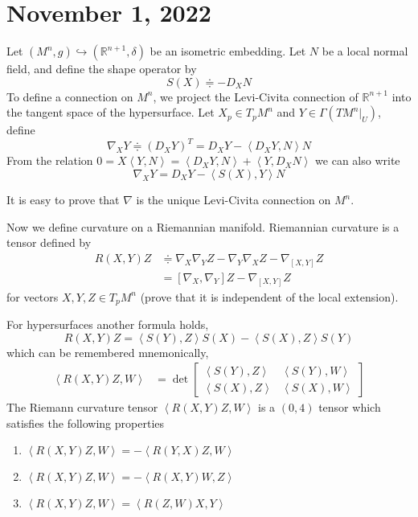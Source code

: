 \documentclass[12pt,a4paper]{article}
\theoremstyle{definition}
\theoremstyle{greenbox}
\newcommand{\define}{\doteqdot}
\newcommand{\Rn}{\mathbb{R}^{n+1}}
\begin{document}
    \section{November 1, 2022}
    Let $ (M^{n},g) \hookrightarrow (\Rn, \delta) $ be an isometric embedding. Let $ N $ be a local normal field, and define the shape operator by
    \[ S(X) \define - D_{X}N \]
    To define a connection on $ M^{n} $, we project the Levi-Civita connection of $ \Rn $ into the tangent space of the hypersurface. Let $ X_{p} \in T_{p}M^{n} $ and $ Y \in \Gamma(TM^{n}|_{U}) $, define 
    \[ \nabla_{X}Y \define (D_{X}Y)^{T} = D_{X}Y - \left< D_{X}Y,N \right>N \]
    From the relation $ 0 = X \left< Y,N \right> = \left< D_{X}Y,N \right> + \left< Y,D_{X}N \right> $ we can also write 
    \[ \nabla_{X}Y = D_{X}Y - \left< S(X),Y \right>N \]
    
    It is easy to prove that $ \nabla $ is the unique Levi-Civita connection on $ M^{n} $.
    
    Now we define curvature on a Riemannian manifold. Riemannian curvature is a tensor defined by 
    \begin{align*}
        R(X,Y)Z & \define \nabla_{X} \nabla_{Y}Z - \nabla_{Y}\nabla_{X}Z - \nabla_{[X,Y]}Z\\
        & = [\nabla_{X},\nabla_{Y}]Z - \nabla_{[X,Y]}Z
    \end{align*}
    for vectors $ X,Y,Z \in T_{p}M^{n} $ (prove that it is independent of the local extension).
    
    For hypersurfaces another formula holds, 
    \[ R(X,Y)Z = \left< S(Y),Z \right>S(X) - \left< S(X),Z \right>S(Y) \]
    which can be remembered mnemonically, 
    \begin{align*}
        \left< R(X,Y)Z,W \right> &= \det \begin{bmatrix}
            \left< S(Y),Z \right> & \left< S(Y),W \right>\\ 
            \left< S(X),Z \right> & \left< S(X),W \right>
        \end{bmatrix} 
    \end{align*}
    The Riemann curvature tensor $ \left< R(X,Y)Z,W \right> $ is a $ (0,4) $ tensor which satisfies the following properties   
    \begin{enumerate}
        
        \item $ \left< R(X,Y)Z,W \right> = - \left< R(Y,X)Z,W \right> $
        \item $ \left< R(X,Y)Z,W \right> = - \left< R(X,Y)W,Z \right> $
        \item $ \left< R(X,Y)Z,W \right> = \left< R(Z,W)X,Y \right> $
    \end{enumerate}
    
\end{document}
